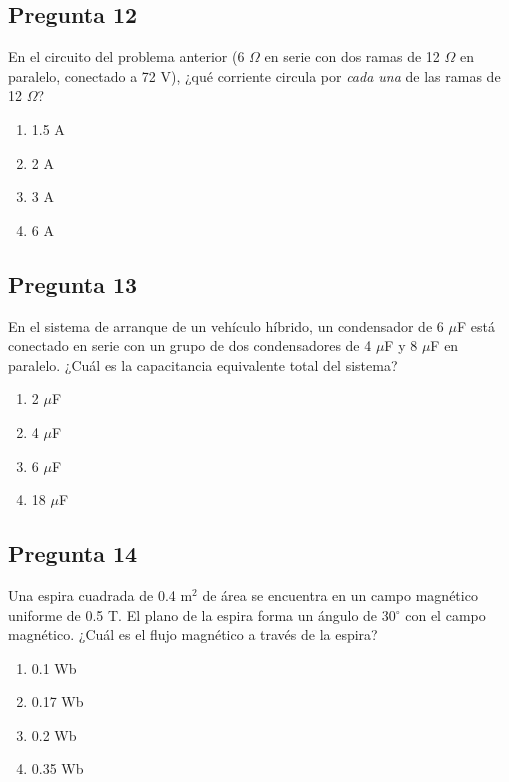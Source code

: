 \begin{preguntabox}
\subsection{Pregunta 12}
En el circuito del problema anterior (6 $\Omega$ en serie con dos ramas de 12 $\Omega$ en paralelo, conectado a 72 V), ¿qué corriente circula por \textit{cada una} de las ramas de 12 $\Omega$?

\begin{enumerate}
    \item[A)] 1.5 A
    \item[B)] 2 A
    \item[C)] 3 A
    \item[D)] 6 A
\end{enumerate}
\end{preguntabox}

\begin{preguntabox}
\subsection{Pregunta 13}
En el sistema de arranque de un vehículo híbrido, un condensador de 6 $\mu$F está conectado en serie con un grupo de dos condensadores de 4 $\mu$F y 8 $\mu$F en paralelo. ¿Cuál es la capacitancia equivalente total del sistema?

\begin{enumerate}
    \item[A)] 2 $\mu$F
    \item[B)] 4 $\mu$F
    \item[C)] 6 $\mu$F
    \item[D)] 18 $\mu$F
\end{enumerate}
\end{preguntabox}

\begin{preguntabox}
\subsection{Pregunta 14}
Una espira cuadrada de 0.4 m$^2$ de área se encuentra en un campo magnético uniforme de 0.5 T. El plano de la espira forma un ángulo de 30$^\circ$ con el campo magnético. ¿Cuál es el flujo magnético a través de la espira?

\begin{enumerate}
    \item[A)] 0.1 Wb
    \item[B)] 0.17 Wb
    \item[C)] 0.2 Wb
    \item[D)] 0.35 Wb
\end{enumerate}
\end{preguntabox}

